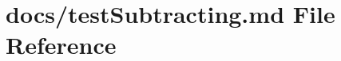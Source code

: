 \hypertarget{test_subtracting_8md}{}\section{docs/test\+Subtracting.md File Reference}
\label{test_subtracting_8md}
